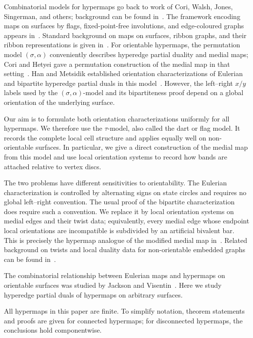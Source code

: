 \documentclass{article}
\theoremstyle{definition}
\theoremstyle{remark}
\begin{document}
Combinatorial models for hypermaps go back to work of Cori, Walsh, Jones, Singerman, and others; background can be found in~\cite{Cori1975,Walsh1975,JonesSingerman1978,LandoZvonkin2004}. The framework encoding maps on surfaces by flags, fixed-point-free involutions, and edge-coloured graphs appears in~\cite{Lins1982,Vince1983}. Standard background on maps on surfaces, ribbon graphs, and their ribbon representations is given in~\cite{GrossTucker1987,EllisMonaghanMoffatt2013}. For orientable hypermaps, the permutation model $(\sigma,\alpha)$ conveniently describes hyperedge partial duality and medial maps; Cori and Hetyei gave a permutation construction of the medial map in that setting~\cite{CoriHetyei2025}. Han and Metsidik established orientation characterizations of Eulerian and bipartite hyperedge partial duals in this model~\cite[Theorems~5.3 and~6.5]{HanMetsidik2026}. However, the left--right $x/y$ labels used by the $(\sigma,\alpha)$-model and its bipartiteness proof depend on a global orientation of the underlying surface.

Our aim is to formulate both orientation characterizations uniformly for all hypermaps. We therefore use the $\tau$-model, also called the dart or flag model. It records the complete local cell structure and applies equally well on non-orientable surfaces. In particular, we give a direct construction of the medial map from this model and use local orientation systems to record how bands are attached relative to vertex discs.

The two problems have different sensitivities to orientability. The Eulerian characterization is controlled by alternating signs on state circles and requires no global left--right convention. The usual proof of the bipartite characterization does require such a convention. We replace it by local orientation systems on medial edges and their twist data; equivalently, every medial edge whose endpoint local orientations are incompatible is subdivided by an artificial bivalent bar. This is precisely the hypermap analogue of the modified medial map in~\cite{DengJinMetsidik2020}. Related background on twists and local duality data for non-orientable embedded graphs can be found in~\cite{EllisMonaghanMoffatt2012}.

The combinatorial relationship between Eulerian maps and hypermaps on orientable surfaces was studied by Jackson and Visentin~\cite{JacksonVisentin1999}. Here we study hyperedge partial duals of hypermaps on arbitrary surfaces.

All hypermaps in this paper are finite. To simplify notation, theorem statements and proofs are given for connected hypermaps; for disconnected hypermaps, the conclusions hold componentwise.
\end{document}
